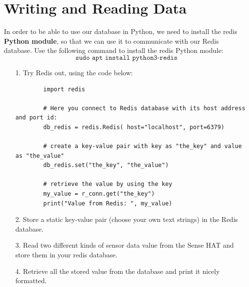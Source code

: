 \documentclass{article}
\begin{document}
\section{Writing and Reading Data}
In order to be able to use our database in Python, we need to install the redis \textbf{Python module}, so that we can use it to communicate with our Redis database. Use the following command to install the redis Python module:
\begin{equation}
    \texttt{sudo apt install python3-redis}
\end{equation}

\noindent

\begin{itemize}

    \item[1.] Try Redis out, using the code below:
    \begin{verbatim}
        import redis

        # Here you connect to Redis database with its host address and port id:
        db_redis = redis.Redis( host="localhost", port=6379)

        # create a key-value pair with key as "the_key" and value as "the_value"
        db_redis.set("the_key", "the_value")

        # retrieve the value by using the key
        my_value = r_conn.get("the_key")
        print("Value from Redis: ", my_value)
    \end{verbatim}
       
    \item[2.] Store a static key-value pair (choose your own text strings) in the Redis database.
    \item[3.] Read two different kinds of sensor data value from the Sense HAT and store them in your redis database.
    \item[4.] Retrieve all the stored value from the database and print it nicely formatted.
\end{itemize}
\end{document}
